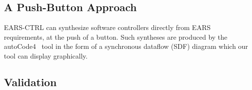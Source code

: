 \subsection{A Push-Button Approach}

\textsf{EARS-CTRL} can synthesize software controllers directly from EARS
requirements, at the push of a button. Such syntheses are produced 
by the \textsf{autoCode4}~\cite{autoCode17} tool in the form
of a synchronous dataflow (SDF) diagram which our tool can display
graphically.\vspace{-.3cm}


\subsection{Validation}
\vspace{-.1cm}

